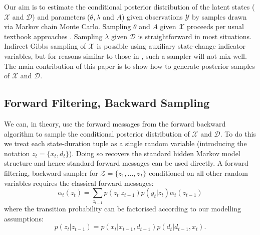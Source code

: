 Our aim is to estimate the conditional posterior distribution of the latent states ($\mathcal{X}$ and $\mathcal{D}$) and parameters ($\theta, \lambda$ and $A$) given observations $\mathcal{Y}$ by samples drawn via Markov chain Monte Carlo. Sampling $\theta$ and $A$ given $\mathcal{X}$ proceeds per usual textbook approaches \cite{Bishop06}.  Sampling $\lambda$ given $\mathcal{D}$ is straightforward in most situations.  Indirect Gibbs sampling  of $\mathcal{X}$ is possible using auxiliary state-change indicator variables, but for reasons similar to those in \cite{Goldwater2009}, such a sampler will not mix well.  The main contribution of this paper is to show how to generate posterior samples of  $\mathcal{X}$ and $\mathcal{D}$.

\subsection{Forward Filtering, Backward Sampling}

We can, in theory, use the forward messages from the forward backward algorithm \cite{Rabiner89} to sample the conditional posterior distribution of $\mathcal{X}$ and $\mathcal{D}.$   To do this we treat each state-duration tuple as a single random variable 
(introducing the notation $z_t = \{x_t,d_t\}$).  
Doing so recovers the standard hidden Markov model structure and hence standard forward messages can be used directly.  A forward filtering, backward sampler for $\mathcal{Z} = \{z_1, \ldots, z_T\}$ conditioned on 
all other random variables
requires the classical forward messages:
    \begin{equation}
        \alpha_t(z_t) = 
        \sum_{z_{t-1}}
        p(z_t | z_{t-1}) 
        p(y_t|z_t) 
        \alpha_t(z_{t-1}) 
        \label{eqn:forward recursion}
    \end{equation}
     where the transition probability can be factorised according to our modelling assumptions:
     \begin{equation}
        p(z_{t} | z_{t-1}) = p(x_t | x_{t-1}, d_{t-1}) p(d_t | d_{t-1}, x_t).
     \end{equation}

